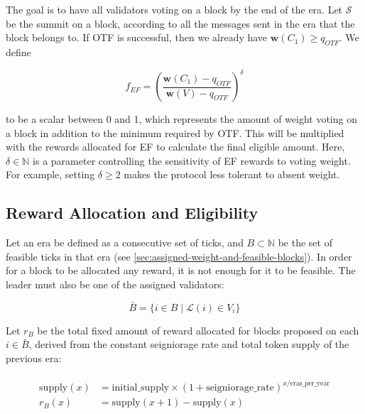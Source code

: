 The goal is to have all validators voting on a block by the end of the era. Let $\mathcal{S}$ be the summit on a block, according to all the messages sent in the era that the block belongs to. If OTF is successful, then we already have $\boldsymbol{w}(C_1)\geq q_{OTF}$. We define

\begin{equation}
f_{EF} = \left(\frac{\boldsymbol{w}(C_1) - q_{OTF}}{\boldsymbol{w}(V)-q_{OTF}}\right)^\delta
\end{equation}

to be a scalar between 0 and 1, which represents the amount of weight voting on a block in addition to the minimum required by OTF. This will be multiplied with the rewards allocated for EF to calculate the final eligible amount. Here, $\delta \in \mathbb{N}$ is a parameter controlling the sensitivity of EF rewards to voting weight. For example, setting $\delta \geq 2$ makes the protocol less tolerant to absent weight.

\subsection{Reward Allocation and Eligibility}
\label{sec:reward-allocation-eligibility}

Let an era be defined as a consecutive set of ticks, and $B\subset\mathbb{N}$ be the set of feasible ticks in that era (see \ref{sec:assigned-weight-and-feasible-blocks}). In order for a block to be allocated any reward, it is not enough for it to be feasible. The leader must also be one of the assigned validators:

\begin{equation}
\bar{B}=\{i\in B \mid \mathcal{L}(i) \in V_i\}
\end{equation}

Let $r_B$ be the total fixed amount of reward allocated for blocks proposed on each $i\in \bar{B}$, derived from the constant seigniorage rate and total token supply of the previous era:

\begin{equation}
\begin{split}\begin{aligned}
\text{supply}(x) &= \text{initial}\_\text{supply}\times (1+\text{seigniorage}\_\text{rate})^{x/\text{eras}\_\text{per}\_\text{year}} \\
r_B(x) &= \text{supply}(x+1) - \text{supply}(x)
\end{aligned}\end{split}
\end{equation}

